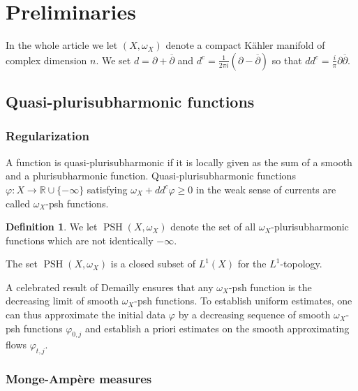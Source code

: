 \documentclass[a4paper,11pt,leqno,english]{smfart}
\theoremstyle{plain}
\theoremstyle{plain}
\numberwithin{equation}{section} %
\numberwithin{figure}{section} %
\theoremstyle{plain}
\theoremstyle{plain}
\theoremstyle{remark}
\theoremstyle{remark}
\theoremstyle{definition}
\theoremstyle{plain}
\theoremstyle{plain}
\theoremstyle{definition}
\newtheorem{defi}[thm]{Definition}
\newcommand{\R}{{\mathbb{R}}}
\newcommand{\f}{\varphi}
\newcommand{\PSH}{\operatorname{PSH}}
\begin{document}
 
 
 \section{Preliminaries}  
 \label{sec-smoo-flow}
 
 In the whole article we let $(X,\omega_X)$ denote a compact K\"ahler manifold of complex dimension $n$.
 We set $d=\partial+\overline{\partial}$ and $d^c=\frac{1}{2 \pi i}(\partial-\overline{\partial})$ 
 so that
$dd^c =\frac{i}{\pi}\partial\overline{\partial}$.
 
 
 \subsection{Quasi-plurisubharmonic functions}
 
 
  \subsubsection{Regularization}
 
 A function is quasi-plurisub\-harmonic if it is locally given as the sum of  a smooth and a plurisubharmonic function.   
 Quasi-plurisubharmonic functions
$\f:X \rightarrow \R \cup \{-\infty\}$ satisfying
$
\omega_X+dd^c \f \geq 0
$
in the weak sense of currents are called $\omega_X$-psh functions. 


 
\begin{defi}
We let $\PSH(X,\omega_X)$ denote the set of all $\omega_X$-plurisubharmonic functions which are not identically $-\infty$.  
\end{defi}

The set $\PSH(X,\omega_X)$ is a closed subset of $L^1(X)$ for the $L^1$-topology. 

\smallskip

A celebrated result of Demailly \cite{D92} ensures that any 
$\omega_X$-psh function is the decreasing limit of smooth $\omega_X$-psh functions.
To establish uniform estimates, one can thus approximate the initial data
$\f$ by a decreasing sequence of smooth $\omega_X$-psh functions $\f_{0,j}$
and establish a priori estimates on the smooth approximating flows $\f_{t,j}$.



 \subsubsection{Monge-Amp\`ere measures}
 
\end{document}
